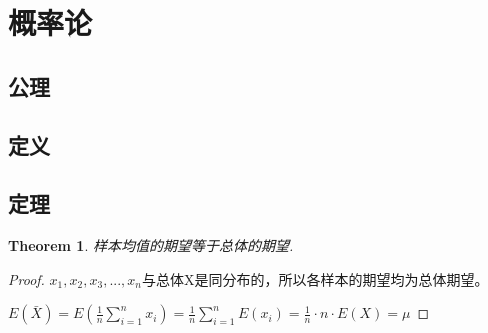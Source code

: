 \documentclass[UTF-8]{ctexart}
\newtheorem{theorem}{Theorem}[section]
\newtheorem{proof}{Proof}[section]
\begin{document}
\newpage
\section{概率论}

\subsection{公理}
\subsection{定义}
\subsection{定理}
\begin{theorem}
样本均值的期望等于总体的期望.
\end{theorem}
\begin{proof}
$x_1,x_2,x_3,...,x_n$与总体X是同分布的，所以各样本的期望均为总体期望。

$E(\bar{X})=E(\frac{1}{n}\sum_{i=1}^{n}x_{i})=\frac{1}{n}\sum_{i=1}^{n}E(x_{i})=\frac{1}{n}\cdot n\cdot E(X)=\mu $
\end{proof}
\end{document}
